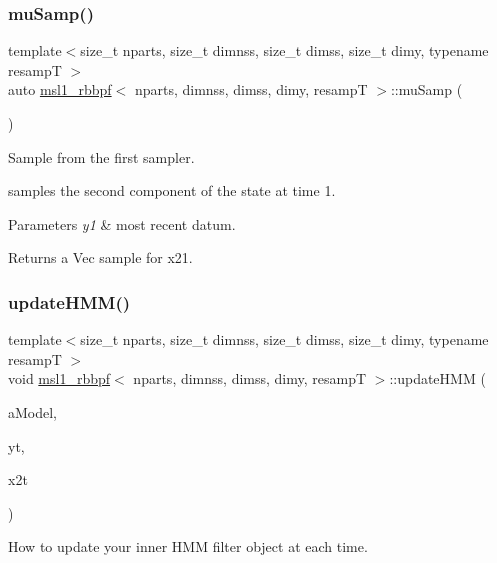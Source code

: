 \subsubsection{\texorpdfstring{mu\+Samp()}{muSamp()}}
{\footnotesize\ttfamily template$<$size\+\_\+t nparts, size\+\_\+t dimnss, size\+\_\+t dimss, size\+\_\+t dimy, typename resampT $>$ \\
auto \hyperlink{classmsl1__rbbpf}{msl1\+\_\+rbbpf}$<$ nparts, dimnss, dimss, dimy, resampT $>$\+::mu\+Samp (\begin{DoxyParamCaption}{ }\end{DoxyParamCaption})}



Sample from the first sampler. 

samples the second component of the state at time 1. 
\begin{DoxyParams}{Parameters}
{\em y1} & most recent datum. \\
\hline
\end{DoxyParams}
\begin{DoxyReturn}{Returns}
a Vec sample for x21. 
\end{DoxyReturn}
\mbox{\label{classmsl1__rbbpf_aa22847dfe35723fa3623385d1b534989}} 
\subsubsection{\texorpdfstring{update\+H\+M\+M()}{updateHMM()}}
{\footnotesize\ttfamily template$<$size\+\_\+t nparts, size\+\_\+t dimnss, size\+\_\+t dimss, size\+\_\+t dimy, typename resampT $>$ \\
void \hyperlink{classmsl1__rbbpf}{msl1\+\_\+rbbpf}$<$ nparts, dimnss, dimss, dimy, resampT $>$\+::update\+H\+MM (\begin{DoxyParamCaption}\item[{hmm$<$ dimnss, dimy $>$ \&}]{a\+Model,  }\item[{const \hyperlink{classmsl1__rbbpf_a23daf10ba0f0b6fead88bc83b4fa27a3}{osv} \&}]{yt,  }\item[{const \hyperlink{classmsl1__rbbpf_a6703c548bb85bbe8e5a6baa723e8f0bb}{sssv} \&}]{x2t }\end{DoxyParamCaption})}



How to update your inner H\+MM filter object at each time. 

